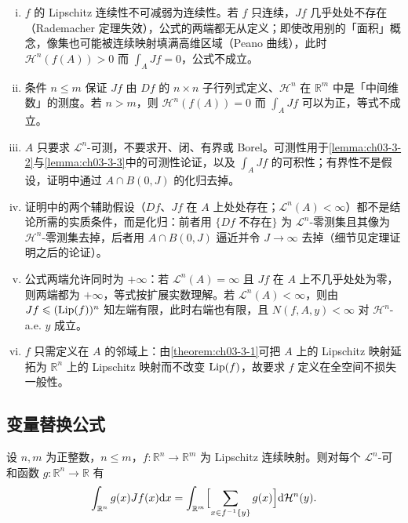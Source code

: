 \documentclass[../../main.tex]{subfiles}%
\begin{document}
\begin{remark}\label{remark:ch03-thm-3-8-条件}
\begin{enumerate}[(i)]
\item $f$ 的 Lipschitz 连续性不可减弱为连续性。若 $f$ 只连续，$Jf$ 几乎处处不存在（Rademacher 定理失效），公式的两端都无从定义；即使改用别的「面积」概念，像集也可能被连续映射填满高维区域（Peano 曲线），此时 $\mathcal{H}^n(f(A))>0$ 而 $\int_AJf=0$，公式不成立。
\item 条件 $n\leqslant m$ 保证 $Jf$ 由 $Df$ 的 $n\times n$ 子行列式定义、$\mathcal{H}^n$ 在 $\mathbb{R}^m$ 中是「中间维数」的测度。若 $n>m$，则 $\mathcal{H}^n(f(A))=0$ 而 $\int_AJf$ 可以为正，等式不成立。
\item $A$ 只要求 $\mathcal{L}^n$-可测，不要求开、闭、有界或 Borel。可测性用于\cref{lemma:ch03-3-2}与\cref{lemma:ch03-3-3}中的可测性论证，以及 $\int_AJf$ 的可积性；有界性不是假设，证明中通过 $A\cap B(0,J)$ 的化归去掉。%
\item 证明中的两个辅助假设（$Df$、$Jf$ 在 $A$ 上处处存在；$\mathcal{L}^n(A)<\infty$）都不是结论所需的实质条件，而是化归：前者用 $\{Df\text{ 不存在}\}$ 为 $\mathcal{L}^n$-零测集且其像为 $\mathcal{H}^n$-零测集去掉，后者用 $A\cap B(0,J)$ 逼近并令 $J\to\infty$ 去掉（细节见定理证明之后的论证）。
\item 公式两端允许同时为 $+\infty$：若 $\mathcal{L}^n(A)=\infty$ 且 $Jf$ 在 $A$ 上不几乎处处为零，则两端都为 $+\infty$，等式按扩展实数理解。若 $\mathcal{L}^n(A)<\infty$，则由 $Jf\leqslant(\operatorname{Lip}(f))^n$ 知左端有限，此时右端也有限，且 $N(f,A,y)<\infty$ 对 $\mathcal{H}^n$-a.e. $y$ 成立。
\item $f$ 只需定义在 $A$ 的邻域上：由\cref{theorem:ch03-3-1}可把 $A$ 上的 Lipschitz 映射延拓为 $\mathbb{R}^n$ 上的 Lipschitz 映射而不改变 $\operatorname{Lip}(f)$，故要求 $f$ 定义在全空间不损失一般性。%
\end{enumerate}
\end{remark}

\subsection{变量替换公式}\label{subsection:ch03-03-3}

\begin{theorem}[变量替换]\label{theorem:ch03-3-9}
设 $n,m$ 为正整数，$n\leqslant m$，$f:\mathbb{R}^n\to\mathbb{R}^m$ 为 Lipschitz 连续映射。则对每个 $\mathcal{L}^n$-可和函数 $g:\mathbb{R}^n\to\mathbb{R}$ 有
\begin{align*}
\int_{\mathbb{R}^n}g(x)Jf(x)\mathrm{d} x=\int_{\mathbb{R}^m}\Bigl[\sum_{x\in f^{-1}\{y\}}g(x)\Bigr]\mathrm{d}\mathcal{H}^n(y).
\end{align*}
\end{theorem}
\end{document}
